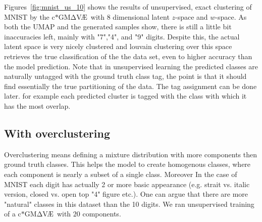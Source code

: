 \documentclass[11pt, a4paper]{report}
\theoremstyle{plain}
\theoremstyle{definition}
\theoremstyle{remark}
\newcommand{\gmvae}{c$\ast$GM$\mathrm{\Delta}$V\AE~}
\begin{document}
Figures~\ref{fig:mnist_us_10} shows the results of unsupervised, exact clustering
of MNIST by the \gmvae with 8 dimensional latent $z$-space and
$w$-space.
As both the UMAP and the generated samples show, there is still a little bit
inaccuracies left, mainly with "7","4", and "9" digits.
Despite this, the actual latent space is very nicely clustered and louvain
clustering over this space retrieves the true classification of the the data
set, even to higher accuracy than the model prediction.
Note that in unsupervised learning the predicted classes are naturally untagged
with the ground truth class tag, the point is that it should find essentially
the true partitioning of the data. The tag assignment can be done later. for
example each predicted cluster is tagged with the class with which it has the
most overlap.

\subsection{With overclustering}
Overclustering means defining a mixture distribution with more components then
ground truth classes. This helps the model to create homogenous classes,
where each component is nearly a subset of a single class.
Moreover In the case of MNIST each digit has actually 2 or more basic appearance (e.g. 
strait vs. italic version, closed vs. open top "4" figure etc.). One can argue
that there are more "natural" classes in this dataset than the 10 digits.
We ran unsupervised training of a \gmvae with $20$ components.
\end{document}
